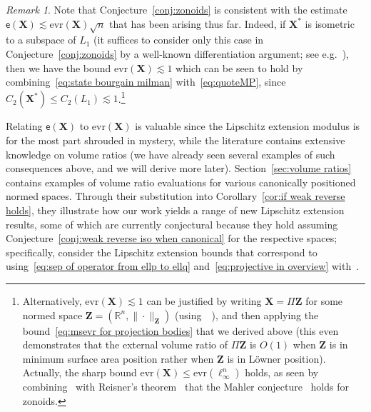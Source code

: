 \documentclass[11pt,reqno]{amsart}
\renewcommand{\le}{\leqslant}
\newcommand{\evr}{\mathrm{evr}}
\newcommand{\X}{\mathbf X}
\newcommand{\R}{\mathbb R}
\theoremstyle{remark}
\newtheorem{remark}[theorem]{Remark}
\newcommand{\ee}{\mathsf{e}}
\newcommand{\bfZ}{\mathbf{Z}}
\renewcommand{\1}{\mathbf 1}
\begin{document}
\begin{remark}
Note that Conjecture~\ref{conj:zonoids} is consistent with the  estimate $\ee(\X)\lesssim \evr(\X)\sqrt{n}$ that has been arising thus far. Indeed, if  $\X^*$ is isometric to a subspace of $L_1$ (it suffices to consider only this case in Conjecture~\ref{conj:zonoids} by a well-known differentiation argument; see e.g.~\cite[Corollary~7.10]{BL00}), then we have the bound $\evr(\X)\lesssim 1$ which can be seen to hold by combining~\eqref{eq:state bourgain milman} with~\eqref{eq:quoteMP}, since $C_2(\X^*)\le C_2(L_1)\lesssim 1$.\footnote{Alternatively,  $\evr(\X)\lesssim 1$ can be justified by writing $\X=\Pi\bfZ$ for some normed space $\bfZ=(\R^n,\|\cdot\|_\bfZ)$ (using~~\cite{Bol69,Sch83}), and then applying the bound~\eqref{eq:msevr for projection bodies} that we derived above (this even demonstrates that the external volume ratio of $\Pi\bfZ$ is $O(1)$ when $\bfZ$ is in minimum surface area position rather when $\bfZ$ is in L\"owner position). Actually,  the sharp bound $\evr(\X)\le \evr(\ell_\infty^n)$ holds, as seen by combining~\cite[Theorem~6]{Bal91-reverse} with Reisner's theorem~\cite{Rei86} that the Mahler conjecture~\cite{Mah39} holds for zonoids.}
\end{remark}



Relating $\ee(\X)$ to $\evr(\X)$ is valuable since the Lipschitz extension modulus is for the most part shrouded in mystery, while  the literature contains extensive knowledge on volume ratios (we have already seen several examples of such consequences above, and we will derive more later). Section~\ref{sec:volume ratios} contains  examples of volume ratio evaluations for various canonically positioned normed spaces. Through their substitution into Corollary~\ref{cor:if weak reverse holds}, they illustrate how our work yields a range of new Lipschitz extension results, some of which are currently conjectural because they hold assuming Conjecture~\ref{conj:weak reverse iso when canonical}  for the respective spaces; specifically, consider the Lipschitz extension bounds that correspond  to using~\eqref{eq:sep of operator from ellp to ellq} and~\eqref{eq:projective in overview} with~\cite{LN05}.
\end{document}
